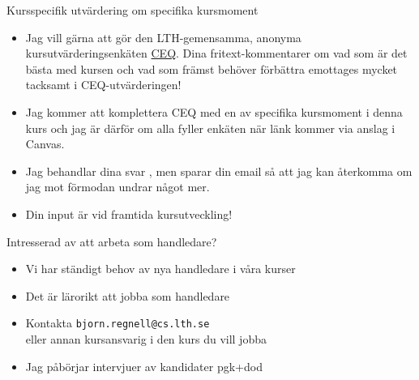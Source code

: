 \begin{Slide}{Kursspecifik utvärdering om specifika kursmoment}\SlideFontSmall
\begin{itemize}
\item Jag vill gärna att  gör den LTH-gemensamma, anonyma kursutvärderingsenkäten \href{https://www.ceq.lth.se/}{CEQ}. Dina fritext-kommentarer om vad som är det bästa med kursen och vad som främst behöver förbättra emottages mycket tacksamt i CEQ-utvärderingen!
\item Jag kommer att komplettera CEQ med en  av specifika kursmoment i denna kurs och jag är därför  om alla fyller enkäten när länk kommer via anslag i Canvas.
\item Jag behandlar dina svar , men sparar din email så att jag kan återkomma om jag mot förmodan undrar något mer.
\item Din input är  vid framtida kursutveckling!
\end{itemize}
\end{Slide}

\begin{Slide}{Intresserad av att arbeta som handledare?}
\begin{itemize}
\item Vi har ständigt behov av nya handledare i våra kurser
\item Det är lärorikt att jobba som handledare
\item Kontakta \verb|bjorn.regnell@cs.lth.se| \\eller annan kursansvarig i den kurs du vill jobba
\item Jag påbörjar intervjuer av kandidater pgk+dod 
\end{itemize}

\end{Slide}


